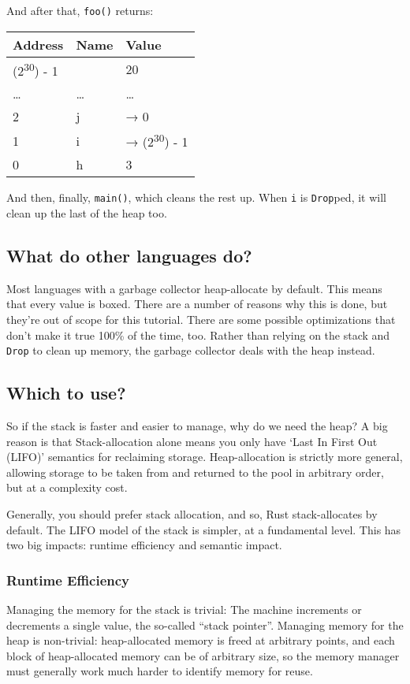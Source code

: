 \documentclass[a4paper,]{book}
\begin{document}
And after that, \texttt{foo()} returns:

\begin{longtable}[c]{@{}lll@{}}
\toprule
Address & Name & Value\tabularnewline
\midrule
\endhead
(2\textsuperscript{30}) - 1 & & 20\tabularnewline
\ldots{} & \ldots{} & \ldots{}\tabularnewline
2 & j & → 0\tabularnewline
1 & i & → (2\textsuperscript{30}) - 1\tabularnewline
0 & h & 3\tabularnewline
\bottomrule
\end{longtable}

And then, finally, \texttt{main()}, which cleans the rest up. When
\texttt{i} is \texttt{Drop}ped, it will clean up the last of the heap
too.

\subsection{What do other languages
do?}\label{what-do-other-languages-do}

Most languages with a garbage collector heap-allocate by default. This
means that every value is boxed. There are a number of reasons why this
is done, but they're out of scope for this tutorial. There are some
possible optimizations that don't make it true 100\% of the time, too.
Rather than relying on the stack and \texttt{Drop} to clean up memory,
the garbage collector deals with the heap instead.

\subsection{Which to use?}\label{which-to-use}

So if the stack is faster and easier to manage, why do we need the heap?
A big reason is that Stack-allocation alone means you only have `Last In
First Out (LIFO)' semantics for reclaiming storage. Heap-allocation is
strictly more general, allowing storage to be taken from and returned to
the pool in arbitrary order, but at a complexity cost.

Generally, you should prefer stack allocation, and so, Rust
stack-allocates by default. The LIFO model of the stack is simpler, at a
fundamental level. This has two big impacts: runtime efficiency and
semantic impact.

\subsubsection{Runtime Efficiency}\label{runtime-efficiency}

Managing the memory for the stack is trivial: The machine increments or
decrements a single value, the so-called ``stack pointer''. Managing
memory for the heap is non-trivial: heap-allocated memory is freed at
arbitrary points, and each block of heap-allocated memory can be of
arbitrary size, so the memory manager must generally work much harder to
identify memory for reuse.
\end{document}
